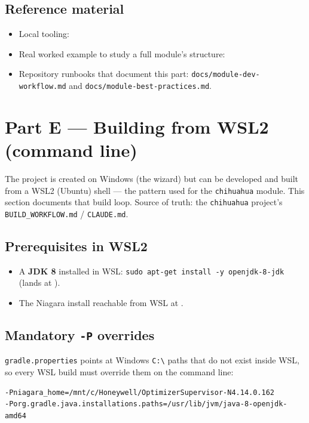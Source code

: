 \documentclass[11pt,a4paper]{article}
\begin{document}
\subsection{Reference material}
\begin{itemize}[nosep]
  \item Local tooling: 
  \item Real worked example to study a full module's structure:
  \item Repository runbooks that document this part:
        \texttt{docs/module-dev-workflow.md} and \texttt{docs/module-best-practices.md}.
\end{itemize}

\section{Part E — Building from WSL2 (command line)}
The project is created on Windows (the wizard) but can be developed and built
from a WSL2 (Ubuntu) shell — the pattern used for the \texttt{chihuahua} module.
This section documents that build loop. Source of truth: the \texttt{chihuahua}
project's \texttt{BUILD\_WORKFLOW.md} / \texttt{CLAUDE.md}.

\subsection{Prerequisites in WSL2}
\begin{itemize}[nosep]
  \item A \textbf{JDK 8} installed in WSL: \texttt{sudo apt-get install -y openjdk-8-jdk}
        (lands at ).
  \item The Niagara install reachable from WSL at
        .
\end{itemize}

\subsection{Mandatory \texttt{-P} overrides}
\texttt{gradle.properties} points at Windows \texttt{C:\textbackslash} paths that
do not exist inside WSL, so every WSL build must override them on the command line:
\begin{lstlisting}
-Pniagara_home=/mnt/c/Honeywell/OptimizerSupervisor-N4.14.0.162
-Porg.gradle.java.installations.paths=/usr/lib/jvm/java-8-openjdk-amd64
\end{lstlisting}
\end{document}
